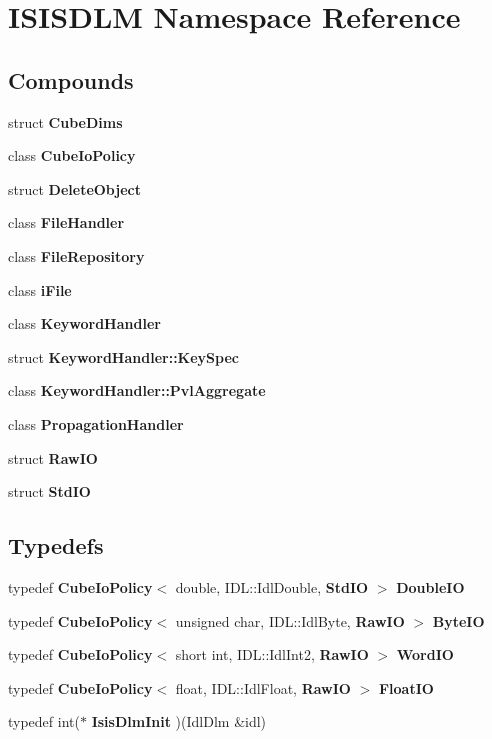 \section{ISISDLM Namespace Reference}
\label{namespaceISISDLM}


\subsection*{Compounds}
\begin{CompactItemize}
\item 
struct {\bf Cube\-Dims}
\item 
class {\bf Cube\-Io\-Policy}
\item 
struct {\bf Delete\-Object}
\item 
class {\bf File\-Handler}
\item 
class {\bf File\-Repository}
\item 
class {\bf i\-File}
\item 
class {\bf Keyword\-Handler}
\item 
struct {\bf Keyword\-Handler::Key\-Spec}
\item 
class {\bf Keyword\-Handler::Pvl\-Aggregate}
\item 
class {\bf Propagation\-Handler}
\item 
struct {\bf Raw\-IO}
\item 
struct {\bf Std\-IO}
\end{CompactItemize}
\subsection*{Typedefs}
\begin{CompactItemize}
\item 
typedef {\bf Cube\-Io\-Policy}$<$ double, IDL::Idl\-Double, {\bf Std\-IO} $>$ {\bf Double\-IO}
\item 
typedef {\bf Cube\-Io\-Policy}$<$ unsigned char, IDL::Idl\-Byte, {\bf Raw\-IO} $>$ {\bf Byte\-IO}
\item 
typedef {\bf Cube\-Io\-Policy}$<$ short int, IDL::Idl\-Int2, {\bf Raw\-IO} $>$ {\bf Word\-IO}
\item 
typedef {\bf Cube\-Io\-Policy}$<$ float, IDL::Idl\-Float, {\bf Raw\-IO} $>$ {\bf Float\-IO}
\item 
typedef int($\ast$ {\bf Isis\-Dlm\-Init} )(Idl\-Dlm \&idl)
\end{CompactItemize}
